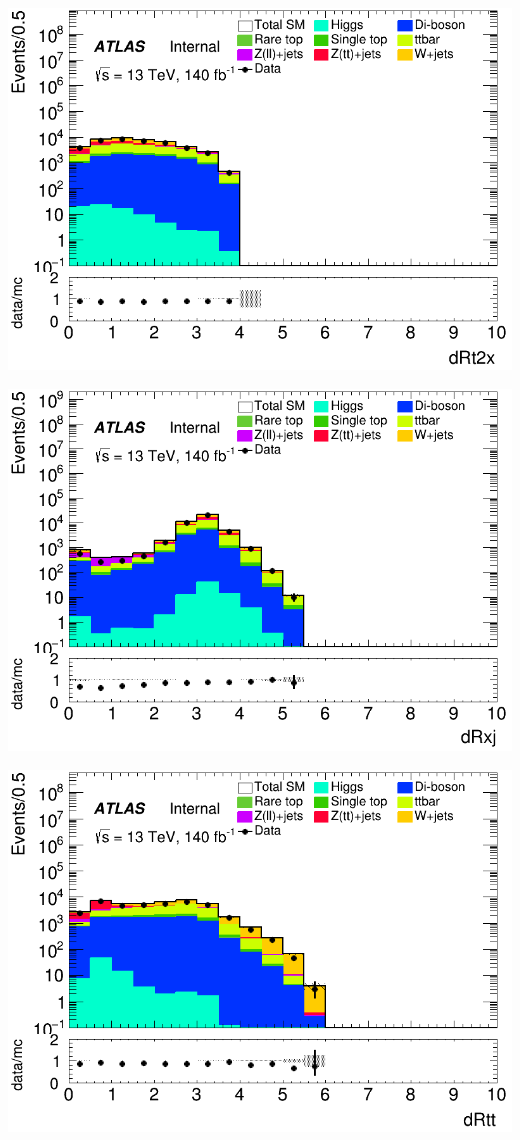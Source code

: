 \documentclass[usenames,dvipsnames]{beamer}
\begin{document}
\begin{frame}
    \begin{minipage}{0.32\textwidth}
        \centering
        \includegraphics[width=\textwidth]{graphics/L_met/L_met_dRt2x.png}
    \end{minipage}
    \hfill
    \begin{minipage}{0.32\textwidth}
        \centering
        \includegraphics[width=\textwidth]{graphics/L_met/L_met_dRxj.png}
    \end{minipage}
    \hfill
    \begin{minipage}{0.32\textwidth}
        \centering
        \includegraphics[width=\textwidth]{graphics/L_met/L_met_dRtt.png}

\end{minipage}
\end{frame}
\end{document}
